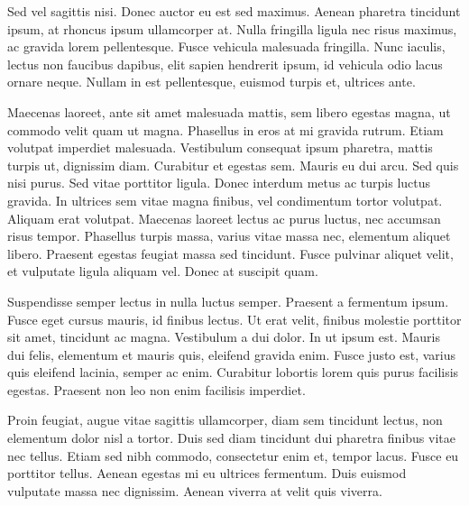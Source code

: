 \documentclass[12pt, letterpaper]{article}
\begin{document}
Sed vel sagittis nisi. Donec auctor eu est sed maximus. Aenean pharetra tincidunt ipsum, at rhoncus ipsum ullamcorper at. Nulla fringilla ligula nec risus maximus, ac gravida lorem pellentesque. Fusce vehicula malesuada fringilla. Nunc iaculis, lectus non faucibus dapibus, elit sapien hendrerit ipsum, id vehicula odio lacus ornare neque. Nullam in est pellentesque, euismod turpis et, ultrices ante.

Maecenas laoreet, ante sit amet malesuada mattis, sem libero egestas magna, ut commodo velit quam ut magna. Phasellus in eros at mi gravida rutrum. Etiam volutpat imperdiet malesuada. Vestibulum consequat ipsum pharetra, mattis turpis ut, dignissim diam. Curabitur et egestas sem. Mauris eu dui arcu. Sed quis nisi purus. Sed vitae porttitor ligula. Donec interdum metus ac turpis luctus gravida. In ultrices sem vitae magna finibus, vel condimentum tortor volutpat. Aliquam erat volutpat. Maecenas laoreet lectus ac purus luctus, nec accumsan risus tempor. Phasellus turpis massa, varius vitae massa nec, elementum aliquet libero. Praesent egestas feugiat massa sed tincidunt. Fusce pulvinar aliquet velit, et vulputate ligula aliquam vel. Donec at suscipit quam.

Suspendisse semper lectus in nulla luctus semper. Praesent a fermentum ipsum. Fusce eget cursus mauris, id finibus lectus. Ut erat velit, finibus molestie porttitor sit amet, tincidunt ac magna. Vestibulum a dui dolor. In ut ipsum est. Mauris dui felis, elementum et mauris quis, eleifend gravida enim. Fusce justo est, varius quis eleifend lacinia, semper ac enim. Curabitur lobortis lorem quis purus facilisis egestas. Praesent non leo non enim facilisis imperdiet.

Proin feugiat, augue vitae sagittis ullamcorper, diam sem tincidunt lectus, non elementum dolor nisl a tortor. Duis sed diam tincidunt dui pharetra finibus vitae nec tellus. Etiam sed nibh commodo, consectetur enim et, tempor lacus. Fusce eu porttitor tellus. Aenean egestas mi eu ultrices fermentum. Duis euismod vulputate massa nec dignissim. Aenean viverra at velit quis viverra.

\newpage
\end{document}
